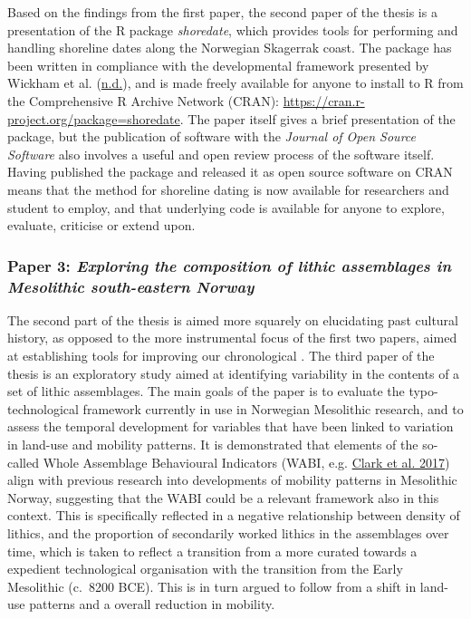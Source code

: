 \documentclass[
  a4paper,
  oneside]{uiophdthesis}
\begin{document}
Based on the findings from the first paper, the second paper of the thesis is a presentation of the R package \emph{shoredate}, which provides tools for performing and handling shoreline dates along the Norwegian Skagerrak coast. The package has been written in compliance with the developmental framework presented by Wickham et al. (\protect\hyperlink{ref-wickhamnd}{n.d.}), and is made freely available for anyone to install to R from the Comprehensive R Archive Network (CRAN): \url{https://cran.r-project.org/package=shoredate}. The paper itself gives a brief presentation of the package, but the publication of software with the \emph{Journal of Open Source Software} also involves a useful and open review process of the software itself. Having published the package and released it as open source software on CRAN means that the method for shoreline dating is now available for researchers and student to employ, and that underlying code is available for anyone to explore, evaluate, criticise or extend upon.

\hypertarget{paper-3-exploring-the-composition-of-lithic-assemblages-in-mesolithic-south-eastern-norway}{%
\subsubsection{\texorpdfstring{Paper 3: \emph{Exploring the composition of lithic assemblages in Mesolithic south-eastern Norway}}{Paper 3: Exploring the composition of lithic assemblages in Mesolithic south-eastern Norway}}\label{paper-3-exploring-the-composition-of-lithic-assemblages-in-mesolithic-south-eastern-norway}}

The second part of the thesis is aimed more squarely on elucidating past cultural history, as opposed to the more instrumental focus of the first two papers, aimed at establishing tools for improving our chronological . The third paper of the thesis is an exploratory study aimed at identifying variability in the contents of a set of lithic assemblages. The main goals of the paper is to evaluate the typo-technological framework currently in use in Norwegian Mesolithic research, and to assess the temporal development for variables that have been linked to variation in land-use and mobility patterns. It is demonstrated that elements of the so-called Whole Assemblage Behavioural Indicators (WABI, e.g. \protect\hyperlink{ref-clark2017}{Clark et al. 2017}) align with previous research into developments of mobility patterns in Mesolithic Norway, suggesting that the WABI could be a relevant framework also in this context. This is specifically reflected in a negative relationship between density of lithics, and the proportion of secondarily worked lithics in the assemblages over time, which is taken to reflect a transition from a more curated towards a expedient technological organisation with the transition from the Early Mesolithic (c.~8200 BCE). This is in turn argued to follow from a shift in land-use patterns and a overall reduction in mobility.
\end{document}
